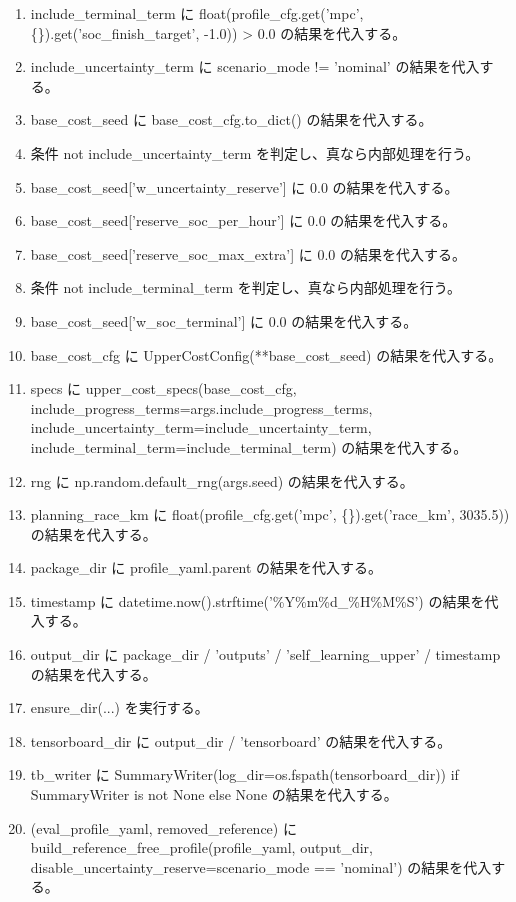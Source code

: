 \documentclass[a4paper,11pt]{article}
\begin{document}
\begin{enumerate}[leftmargin=1.8em]
\item include\_terminal\_term に float(profile\_cfg.get('mpc', \{\}).get('soc\_finish\_target', -1.0)) > 0.0 の結果を代入する。
\item include\_uncertainty\_term に scenario\_mode != 'nominal' の結果を代入する。
\item base\_cost\_seed に base\_cost\_cfg.to\_dict() の結果を代入する。
\item 条件 not include\_uncertainty\_term を判定し、真なら内部処理を行う。
\item   base\_cost\_seed['w\_uncertainty\_reserve'] に 0.0 の結果を代入する。
\item   base\_cost\_seed['reserve\_soc\_per\_hour'] に 0.0 の結果を代入する。
\item   base\_cost\_seed['reserve\_soc\_max\_extra'] に 0.0 の結果を代入する。
\item 条件 not include\_terminal\_term を判定し、真なら内部処理を行う。
\item   base\_cost\_seed['w\_soc\_terminal'] に 0.0 の結果を代入する。
\item base\_cost\_cfg に UpperCostConfig(**base\_cost\_seed) の結果を代入する。
\item specs に upper\_cost\_specs(base\_cost\_cfg, include\_progress\_terms=args.include\_progress\_terms, include\_uncertainty\_term=include\_uncertainty\_term, include\_terminal\_term=include\_terminal\_term) の結果を代入する。
\item rng に np.random.default\_rng(args.seed) の結果を代入する。
\item planning\_race\_km に float(profile\_cfg.get('mpc', \{\}).get('race\_km', 3035.5)) の結果を代入する。
\item package\_dir に profile\_yaml.parent の結果を代入する。
\item timestamp に datetime.now().strftime('\%Y\%m\%d\_\%H\%M\%S') の結果を代入する。
\item output\_dir に package\_dir / 'outputs' / 'self\_learning\_upper' / timestamp の結果を代入する。
\item ensure\_dir(...) を実行する。
\item tensorboard\_dir に output\_dir / 'tensorboard' の結果を代入する。
\item tb\_writer に SummaryWriter(log\_dir=os.fspath(tensorboard\_dir)) if SummaryWriter is not None else None の結果を代入する。
\item (eval\_profile\_yaml, removed\_reference) に build\_reference\_free\_profile(profile\_yaml, output\_dir, disable\_uncertainty\_reserve=scenario\_mode == 'nominal') の結果を代入する。

\end{enumerate}
\end{document}
